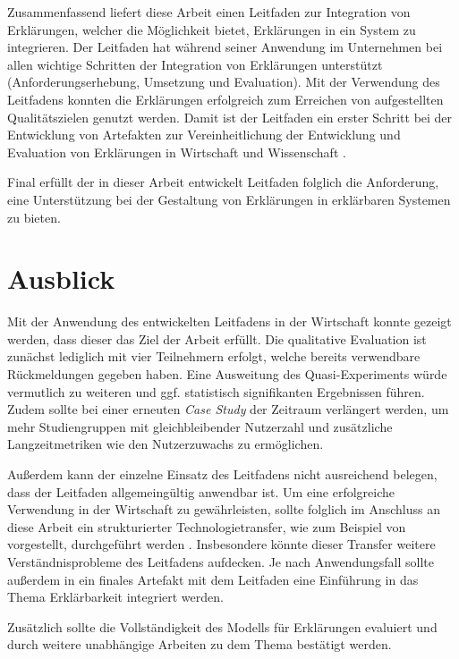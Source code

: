Zusammenfassend liefert diese Arbeit einen Leitfaden zur Integration von Erklärungen, welcher die Möglichkeit bietet, Erklärungen in ein System zu integrieren. Der Leitfaden hat während seiner Anwendung im Unternehmen bei allen wichtige Schritten der Integration von Erklärungen unterstützt (Anforderungserhebung, Umsetzung und Evaluation). Mit der Verwendung des Leitfadens konnten die Erklärungen erfolgreich zum Erreichen von aufgestellten Qualitätszielen genutzt werden. Damit ist der Leitfaden ein erster Schritt bei der Entwicklung von Artefakten zur Vereinheitlichung der Entwicklung und Evaluation von Erklärungen in Wirtschaft und Wissenschaft \cite{kohl_explainability_2019,lim_2009_assessing,sokol_explainability_2020}.

Final erfüllt der in dieser Arbeit entwickelt Leitfaden folglich die Anforderung, eine Unterstützung bei der Gestaltung von Erklärungen in erklärbaren Systemen zu bieten.

\section{Ausblick}

Mit der Anwendung des entwickelten Leitfadens in der Wirtschaft konnte gezeigt werden, dass dieser das Ziel der Arbeit erfüllt. Die qualitative Evaluation ist zunächst lediglich mit vier Teilnehmern erfolgt, welche bereits verwendbare Rückmeldungen gegeben haben. Eine Ausweitung des Quasi-Experiments würde vermutlich zu weiteren und ggf. statistisch signifikanten Ergebnissen führen. Zudem sollte bei einer erneuten \textit{Case Study} der Zeitraum verlängert werden, um mehr Studiengruppen mit gleichbleibender Nutzerzahl und zusätzliche Langzeitmetriken wie den Nutzerzuwachs zu ermöglichen.

Außerdem kann der einzelne Einsatz des Leitfadens nicht ausreichend belegen, dass der Leitfaden allgemeingültig anwendbar ist. Um eine erfolgreiche Verwendung in der Wirtschaft zu gewährleisten, sollte folglich im Anschluss an diese Arbeit ein strukturierter Technologietransfer, wie zum Beispiel von \citeauthor{4012630} vorgestellt, durchgeführt werden \cite{4012630}. Insbesondere könnte dieser Transfer weitere Verständnisprobleme des Leitfadens aufdecken. Je nach Anwendungsfall sollte außerdem in ein finales Artefakt mit dem Leitfaden eine Einführung in das Thema Erklärbarkeit integriert werden.

Zusätzlich sollte die Vollständigkeit des Modells für Erklärungen evaluiert und durch weitere unabhängige Arbeiten zu dem Thema bestätigt werden.


